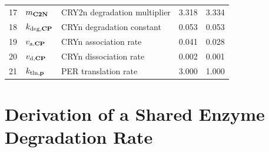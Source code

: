 \begin{table}[h]
\begin{tabular}{cllrr}
    17 & $m_{\text{\bf C2N}}$      & CRY2n degradation multiplier      & 3.318       & 3.334 \\
    18 & $k_{\text{deg,{\bf CP}}}$ & CRYn degradation constant         & 0.053       & 0.053 \\
    19 & $v_{\text{a,{\bf CP}}}$   & CRYn association rate             & 0.041       & 0.028 \\
    20 & $v_{\text{d,{\bf CP}}}$   & CRYn dissociation rate            & 0.002       & 0.001 \\
    21 & $k_{\text{tln,{\bf p}}}$  & PER translation rate              & 3.000       & 1.000 \\ \bottomrule
    \hline
  \end{tabular}
\end{table}


\section{Derivation of a Shared Enzyme Degradation Rate}

